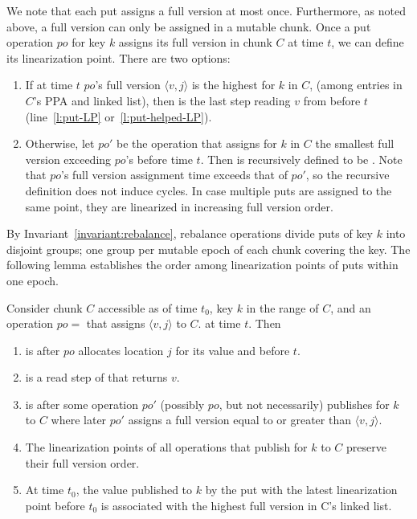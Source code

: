 We note that each put assigns a full version at most once. 
Furthermore, as noted above, a full version can only be assigned in a mutable chunk.
Once a put operation $po$ for key $k$ assigns its full version in chunk $C$ at time $t$, we can define its linearization point. 
There are two options: 
\begin{enumerate}
\item If at time $t$
$po$'s full version $\langle v, j \rangle$ is the highest for $k$ in $C$, (among entries in $C$'s {PPA} and  linked list),
then   is the last step reading $v$ from  before $t$ (line~\ref{l:put-LP} or~\ref{l:put-helped-LP}). 
\item  Otherwise, let $po'$ be the 
 operation that assigns for $k$ in $C$ the smallest full version exceeding $po$'s
before time $t$. Then  is recursively defined to be . Note that 
$po$'s full version assignment time exceeds that of  $po'$, so the recursive definition does not induce cycles. 
In case multiple puts are assigned to the same point, they are linearized in increasing full version order.
\end{enumerate}




By Invariant~\ref{invariant:rebalance},
rebalance operations divide puts of key $k$ into disjoint groups; one group per mutable epoch of each chunk covering the key.
The following lemma 
establishes the order among linearization points of puts within one epoch.
\begin{lemma}
\label{proof:put}
Consider chunk $C$ accessible as of time $t_0$, key $k$ in the range of $C$, and an
operation $po=$ that assigns $\langle v, j\rangle$ to $C$. at time $t$. Then  
\begin{enumerate}
\setlength{\itemsep}{0pt}
\setlength{\parskip}{0pt}
\item \label{proof:put:lp1}  is after $po$ allocates location $j$ for its value and before $t$.
\item \label{proof:put:lp2}  is a read step of  that returns $v$.
\item \label{proof:put:lp3}  is after some operation $po'$ (possibly $po$, but not necessarily) publishes for $k$ to $C$ where later $po'$ assigns a full version equal to or greater than $\langle v, j\rangle$.
\item \label{proof:put:lp4} The linearization points of all operations that publish for $k$ to $C$ preserve their full version order.
\item \label{proof:put:lp5} At time $t_0$, the value published to $k$ by the put with the latest linearization point before $t_0$ is associated with the highest full version in C's linked list.
\end{enumerate}
\end{lemma}


